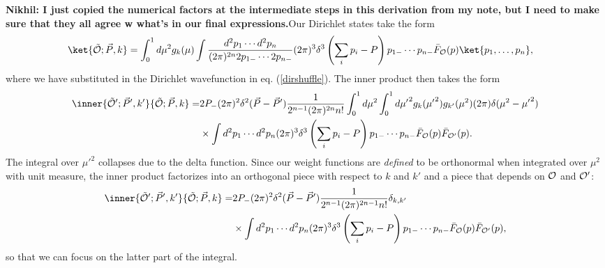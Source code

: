{\color{red} \textbf{Nikhil: I just copied the numerical factors at the intermediate steps in this derivation from my note, but I need to make sure that they all agree w what's in our final expressions.}}Our Dirichlet states take the form \begin{equation}
	\begin{aligned}
		\ket{\tilde{\CO};\vec{P}, k} &= \int_0^{1} d\mu^2 g_k(\mu) \int \frac{d^2p_1 \dotsb d^2p_n}{(2\pi)^{2n} 2p_{1-} \dotsb 2p_{n-}} (2\pi)^3 \delta^3\left(\sum_i p_i - P \right) p_{1-} \dotsb p_{n-} \bar{F}_{\Ocal}(p) \ket{p_1, \dots, p_n},
	\end{aligned}
\end{equation} where we have substituted in the Dirichlet wavefunction in eq. (\ref{dirshuffle}). The inner product then takes the form \begin{equation}
	\begin{aligned}
		\inner{\tilde{\CO}';\vec{P}', k'}{\tilde{\CO};\vec{P}, k} = & 2P_- (2\pi)^2 \delta^2(\vec{P}-\vec{P}')  \frac{1}{2^{n-1} (2\pi)^{2n}  n!}\int_0^{1} d\mu^2 \int_0^{1} d{\mu'}^2 g_k({\mu'}^2) g_{k'}(\mu^2) (2\pi) \delta(\mu^2 - {\mu'}^2) \\
		&\times  \int d^2 p_1 \dotsb d^2 p_n (2\pi)^3 \delta^3\left(\sum_i p_i - P \right) p_{1-} \dotsb p_{n-} \bar{F}_{\Ocal}(p) \bar{F}_{\Ocal'}(p).
	\end{aligned}
\end{equation} The integral over ${\mu'}^2$ collapses due to the delta function. Since our weight functions are \textit{defined} to be orthonormal when integrated over $\mu^2$ with unit measure, the inner product factorizes into an orthogonal piece with respect to $k$ and $k'$ and a piece that depends on ${\cal O}$ and ${\cal O}'$: \begin{equation}
	\begin{aligned}
		\inner{\tilde{\CO}';\vec{P}', k'}{\tilde{\CO};\vec{P}, k} = & 2P_- (2\pi)^2 \delta^2(\vec{P}-\vec{P}')  \frac{1}{2^{n-1} (2\pi)^{2n-1}  n!} \delta_{k,k'} \\
		&\times  \int d^2 p_1 \dotsb d^2 p_n (2\pi)^3 \delta^3\left(\sum_i p_i - P \right) p_{1-} \dotsb p_{n-} \bar{F}_{\Ocal}(p) \bar{F}_{\Ocal'}(p),
	\end{aligned}
\end{equation} so that we can focus on the latter part of the integral.


